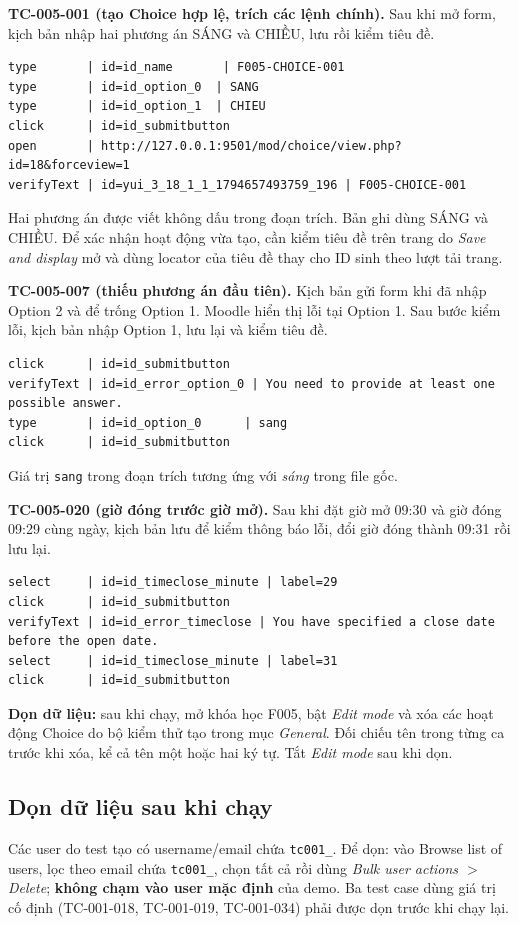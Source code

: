 \documentclass[12pt,a4paper]{article}
\begin{document}
\textbf{TC-005-001 (tạo Choice hợp lệ, trích các lệnh chính).}
Sau khi mở form, kịch bản nhập hai phương án SÁNG và CHIỀU, lưu rồi kiểm tiêu đề.
\begin{lstlisting}
type       | id=id_name       | F005-CHOICE-001
type       | id=id_option_0  | SANG
type       | id=id_option_1  | CHIEU
click      | id=id_submitbutton
open       | http://127.0.0.1:9501/mod/choice/view.php?id=18&forceview=1
verifyText | id=yui_3_18_1_1_1794657493759_196 | F005-CHOICE-001
\end{lstlisting}
Hai phương án được viết không dấu trong đoạn trích. Bản ghi dùng SÁNG và CHIỀU. Để xác nhận hoạt động vừa tạo, cần kiểm tiêu đề trên trang do \textit{Save and display} mở và dùng locator của tiêu đề thay cho ID sinh theo lượt tải trang.

\textbf{TC-005-007 (thiếu phương án đầu tiên).}
Kịch bản gửi form khi đã nhập Option 2 và để trống Option 1. Moodle hiển thị lỗi tại Option 1. Sau bước kiểm lỗi, kịch bản nhập Option 1, lưu lại và kiểm tiêu đề.
\begin{lstlisting}
click      | id=id_submitbutton
verifyText | id=id_error_option_0 | You need to provide at least one possible answer.
type       | id=id_option_0      | sang
click      | id=id_submitbutton
\end{lstlisting}
Giá trị \texttt{sang} trong đoạn trích tương ứng với \textit{sáng} trong file gốc.

\textbf{TC-005-020 (giờ đóng trước giờ mở).}
Sau khi đặt giờ mở 09:30 và giờ đóng 09:29 cùng ngày, kịch bản lưu để kiểm thông báo lỗi, đổi giờ đóng thành 09:31 rồi lưu lại.
\begin{lstlisting}
select     | id=id_timeclose_minute | label=29
click      | id=id_submitbutton
verifyText | id=id_error_timeclose | You have specified a close date before the open date.
select     | id=id_timeclose_minute | label=31
click      | id=id_submitbutton
\end{lstlisting}

\textbf{Dọn dữ liệu:} sau khi chạy, mở khóa học F005, bật \textit{Edit mode} và xóa các hoạt động Choice do bộ kiểm thử tạo trong mục \textit{General}. Đối chiếu tên trong từng ca trước khi xóa, kể cả tên một hoặc hai ký tự. Tắt \textit{Edit mode} sau khi dọn.

\subsection{Dọn dữ liệu sau khi chạy}
Các user do test tạo có username/email chứa \texttt{tc001\_}. Để dọn: vào Browse list of users, lọc theo email chứa
\texttt{tc001\_}, chọn tất cả rồi dùng \textit{Bulk user actions $>$ Delete}; \textbf{không chạm vào user mặc định} của demo.
Ba test case dùng giá trị cố định (TC-001-018, TC-001-019, TC-001-034) phải được dọn trước khi chạy lại.
\end{document}
